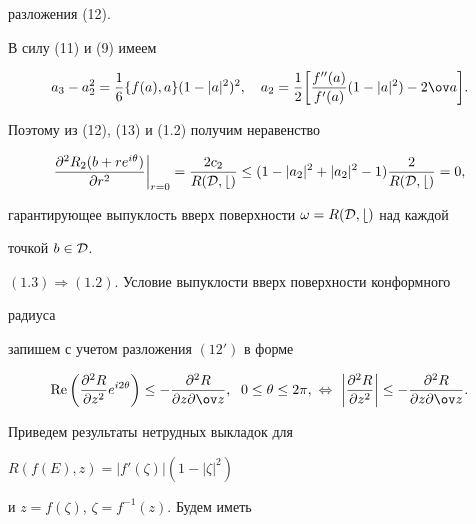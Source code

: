 разложения (12). 


В силу (11) и (9) имеем 


$$ 


a_3-a^2_2=\frac{1}{6}\{f(a),a\}(1-|a|^2)^2,\quad 


a_2=\frac{1}{2}\bigg[\frac{f''(a)}{f'(a)}(1-|a|^2)-2\ov a\bigg]. 


$$ 


Поэтому из (12), (13) и (1.2) получим неравенство 


$$ 


\frac{\partial^2R_2(b+r e^{i\theta})}{\partial r^2}\bigg|_{r=0}= 


\frac{2c_2}{R(\cal D,b)}\le(1-|a_2|^2+|a_2|^2-1) 


\frac{2}{R(\cal D,b)}=0, 


$$ 


гарантирующее выпуклость вверх поверхности $\omega=R(\cal D,b)$ над каждой 


точкой $b\in\cal D$. 


 


$(1.3)\Rightarrow(1.2)$. Условие выпуклости вверх поверхности конформного 


радиуса 


запишем с учетом разложения $(12')$ в форме 


$$ 


\re\bigg(\frac{\partial^2R}{\partial z^2}e^{i2\theta}\bigg)\le 


-\frac{\partial^2R}{\partial z\partial\ov z},\ \; 


0\le\theta\le2\pi,\ \Leftrightarrow\ \bigg| 


\frac{\partial^2R}{\partial z^2}\bigg|\le- 


\frac{\partial^2R}{\partial z\partial\ov z}. 


$$ 


 


Приведем результаты нетрудных выкладок для 


$R(f(E),z)=|f'(\zeta)|(1-|\zeta|^2)$ 


и $z=f(\zeta)$, $\zeta=f^{-1}(z)$. Будем иметь 



